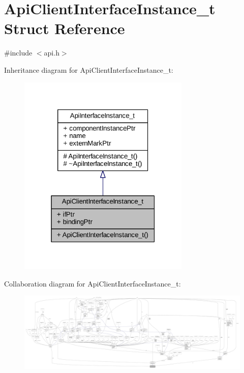 \hypertarget{struct_api_client_interface_instance__t}{}\section{Api\+Client\+Interface\+Instance\+\_\+t Struct Reference}
\label{struct_api_client_interface_instance__t}


{\ttfamily \#include $<$api.\+h$>$}



Inheritance diagram for Api\+Client\+Interface\+Instance\+\_\+t\+:
\nopagebreak
\begin{figure}[H]
\begin{center}
\leavevmode
\includegraphics[width=232pt]{struct_api_client_interface_instance__t__inherit__graph}
\end{center}
\end{figure}


Collaboration diagram for Api\+Client\+Interface\+Instance\+\_\+t\+:
\nopagebreak
\begin{figure}[H]
\begin{center}
\leavevmode
\includegraphics[width=350pt]{struct_api_client_interface_instance__t__coll__graph}
\end{center}
\end{figure}
